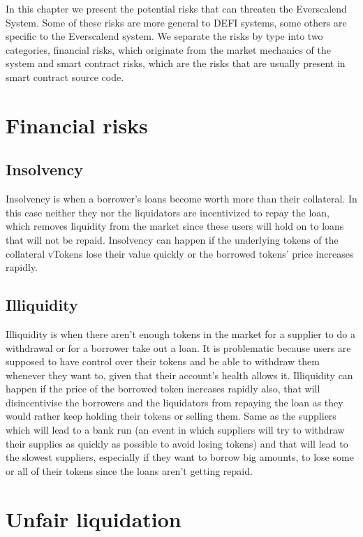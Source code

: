 
In this chapter we present the potential risks that can threaten the Everscalend System. Some of these risks are more general to DEFI systems, some others are specific to the Everscalend system. We separate the risks by type into two categories, financial risks, which originate from the market mechanics of the system and smart contract risks, which are the risks that are usually present in smart contract source code.

\section{Financial risks}

\subsection{Insolvency}

Insolvency is when a borrower's loans become worth more than their collateral. In this case neither they nor the liquidators are incentivized to repay the loan, which removes liquidity from the market since these users will hold on to loans that will not be repaid. Insolvency can happen if the underlying tokens of the collateral vTokens lose their value quickly or the borrowed tokens' price increases rapidly.

\subsection{Illiquidity}

Illiquidity is when there aren't enough tokens in the market for a supplier to do a withdrawal or for a borrower take out a loan. It is problematic because users are supposed to have control over their tokens and be able to withdraw them whenever they want to, given that their account's health allows it. Illiquidity can happen if the price of the borrowed token increases rapidly also, that will disincentivise the borrowers and the liquidators from repaying the loan as they would rather keep holding their tokens or selling them. Same as the suppliers which will lead to a bank run (an event in which suppliers will try to withdraw their supplies as quickly as possible to avoid losing tokens) and that will lead to the slowest suppliers, especially if they want to borrow big amounts, to lose some or all of their tokens since the loans aren't getting repaid.

\section{Unfair liquidation}

